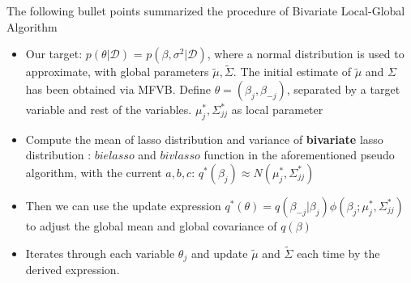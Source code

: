 The following bullet points summarized the procedure of Bivariate Local-Global Algorithm
\begin{itemize}
	\item Our target: $p(\theta|\mathcal{D})$ = $p(\beta, \sigma^2|\mathcal{D})$, where a normal distribution is used to approximate, with global parameters $\tilde{\mu},\tilde{\Sigma}$. The initial estimate of $\tilde{\mu}$ and $\Sigma$ has been obtained via MFVB. Define $\theta = (\beta_j,\beta_{-j})$, separated by a target variable and rest of the variables. $\mu_{j}^*, \Sigma_{jj}^*$ as local parameter
	\item Compute the mean of lasso distribution and variance of \textbf{bivariate} lasso distribution : $bielasso$ and $bivlasso$ function in the aforementioned pseudo algorithm, with the current $a,b,c$: $q^*(\beta_j) \approx N(\mu_j^*,\Sigma_{jj}^*)$
	\item Then we can use the update expression $q^*(\theta) = q(\beta_{-j}|\beta_j)\phi(\beta_j;\mu_j^*,\Sigma_{jj}^*)$ to adjust the global mean and global covariance of $q(\beta)$
	\item Iterates through each variable $\theta_j$ and update $\tilde{\mu}$ and $\tilde{\Sigma}$ each time by the derived expression.
\end{itemize}


